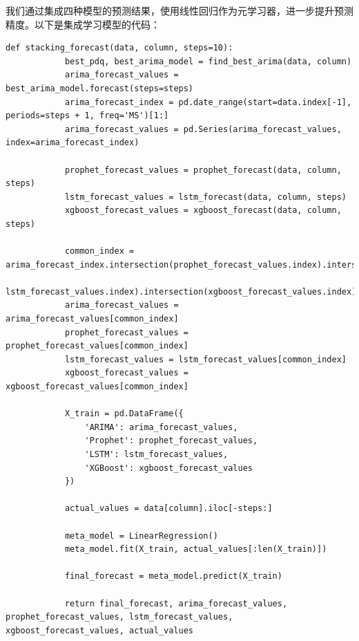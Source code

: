 \documentclass[a4paper]{article}
\begin{document}
	我们通过集成四种模型的预测结果，使用线性回归作为元学习器，进一步提升预测精度。以下是集成学习模型的代码：
	\begin{lstlisting}[caption={Python Example}, label={lst:example}]
		def stacking_forecast(data, column, steps=10):
			best_pdq, best_arima_model = find_best_arima(data, column)
			arima_forecast_values = best_arima_model.forecast(steps=steps)
			arima_forecast_index = pd.date_range(start=data.index[-1], periods=steps + 1, freq='MS')[1:]
			arima_forecast_values = pd.Series(arima_forecast_values, index=arima_forecast_index)

			prophet_forecast_values = prophet_forecast(data, column, steps)
			lstm_forecast_values = lstm_forecast(data, column, steps)
			xgboost_forecast_values = xgboost_forecast(data, column, steps)

			common_index = arima_forecast_index.intersection(prophet_forecast_values.index).intersection(
				lstm_forecast_values.index).intersection(xgboost_forecast_values.index)
			arima_forecast_values = arima_forecast_values[common_index]
			prophet_forecast_values = prophet_forecast_values[common_index]
			lstm_forecast_values = lstm_forecast_values[common_index]
			xgboost_forecast_values = xgboost_forecast_values[common_index]

			X_train = pd.DataFrame({
				'ARIMA': arima_forecast_values,
				'Prophet': prophet_forecast_values,
				'LSTM': lstm_forecast_values,
				'XGBoost': xgboost_forecast_values
			})

			actual_values = data[column].iloc[-steps:]

			meta_model = LinearRegression()
			meta_model.fit(X_train, actual_values[:len(X_train)])

			final_forecast = meta_model.predict(X_train)

			return final_forecast, arima_forecast_values, prophet_forecast_values, lstm_forecast_values, xgboost_forecast_values, actual_values

	\end{lstlisting}
\end{document}

